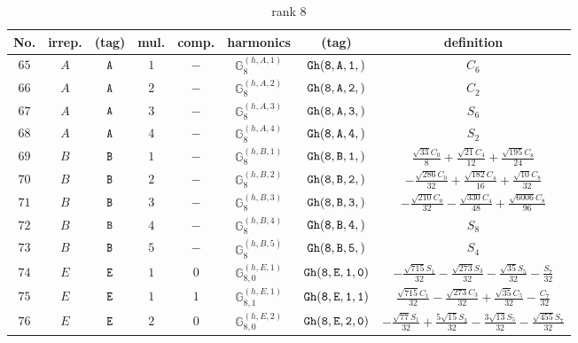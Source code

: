 \documentclass[fleqn,8pt]{jsarticle}
\begin{document}
\begin{table}[ht!]
\begin{center}
\caption{rank 8}
\renewcommand{\arraystretch}{1.3}
\begin{tabular}{cccccccc} \hline \hline
No. & irrep. & (tag) & mul. & comp. & harmonics & (tag) & definition \\ \hline
$ 65 $ & $ A $ & $ {\tt A} $ & $ 1 $ & $ - $ & $ \mathbb{G}_{8}^{(h,A,1)} $ & $ {\tt Gh(8,A,1,)} $ & $ C_{6} $ \\
$ 66 $ & $ A $ & $ {\tt A} $ & $ 2 $ & $ - $ & $ \mathbb{G}_{8}^{(h,A,2)} $ & $ {\tt Gh(8,A,2,)} $ & $ C_{2} $ \\
$ 67 $ & $ A $ & $ {\tt A} $ & $ 3 $ & $ - $ & $ \mathbb{G}_{8}^{(h,A,3)} $ & $ {\tt Gh(8,A,3,)} $ & $ S_{6} $ \\
$ 68 $ & $ A $ & $ {\tt A} $ & $ 4 $ & $ - $ & $ \mathbb{G}_{8}^{(h,A,4)} $ & $ {\tt Gh(8,A,4,)} $ & $ S_{2} $ \\
$ 69 $ & $ B $ & $ {\tt B} $ & $ 1 $ & $ - $ & $ \mathbb{G}_{8}^{(h,B,1)} $ & $ {\tt Gh(8,B,1,)} $ & $ \frac{\sqrt{33} C_{0}}{8} + \frac{\sqrt{21} C_{4}}{12} + \frac{\sqrt{195} C_{8}}{24} $ \\
$ 70 $ & $ B $ & $ {\tt B} $ & $ 2 $ & $ - $ & $ \mathbb{G}_{8}^{(h,B,2)} $ & $ {\tt Gh(8,B,2,)} $ & $ - \frac{\sqrt{286} C_{0}}{32} + \frac{\sqrt{182} C_{4}}{16} + \frac{\sqrt{10} C_{8}}{32} $ \\
$ 71 $ & $ B $ & $ {\tt B} $ & $ 3 $ & $ - $ & $ \mathbb{G}_{8}^{(h,B,3)} $ & $ {\tt Gh(8,B,3,)} $ & $ - \frac{\sqrt{210} C_{0}}{32} - \frac{\sqrt{330} C_{4}}{48} + \frac{\sqrt{6006} C_{8}}{96} $ \\
$ 72 $ & $ B $ & $ {\tt B} $ & $ 4 $ & $ - $ & $ \mathbb{G}_{8}^{(h,B,4)} $ & $ {\tt Gh(8,B,4,)} $ & $ S_{8} $ \\
$ 73 $ & $ B $ & $ {\tt B} $ & $ 5 $ & $ - $ & $ \mathbb{G}_{8}^{(h,B,5)} $ & $ {\tt Gh(8,B,5,)} $ & $ S_{4} $ \\
$ 74 $ & $ E $ & $ {\tt E} $ & $ 1 $ & $ 0 $ & $ \mathbb{G}_{8,0}^{(h,E,1)} $ & $ {\tt Gh(8,E,1,0)} $ & $ - \frac{\sqrt{715} S_{1}}{32} - \frac{\sqrt{273} S_{3}}{32} - \frac{\sqrt{35} S_{5}}{32} - \frac{S_{7}}{32} $ \\
$ 75 $ & $ E $ & $ {\tt E} $ & $ 1 $ & $ 1 $ & $ \mathbb{G}_{8,1}^{(h,E,1)} $ & $ {\tt Gh(8,E,1,1)} $ & $ \frac{\sqrt{715} C_{1}}{32} - \frac{\sqrt{273} C_{3}}{32} + \frac{\sqrt{35} C_{5}}{32} - \frac{C_{7}}{32} $ \\
$ 76 $ & $ E $ & $ {\tt E} $ & $ 2 $ & $ 0 $ & $ \mathbb{G}_{8,0}^{(h,E,2)} $ & $ {\tt Gh(8,E,2,0)} $ & $ - \frac{\sqrt{77} S_{1}}{32} + \frac{5 \sqrt{15} S_{3}}{32} - \frac{3 \sqrt{13} S_{5}}{32} - \frac{\sqrt{455} S_{7}}{32} $ \\

\end{tabular}
\end{center}
\end{table}
\end{document}
